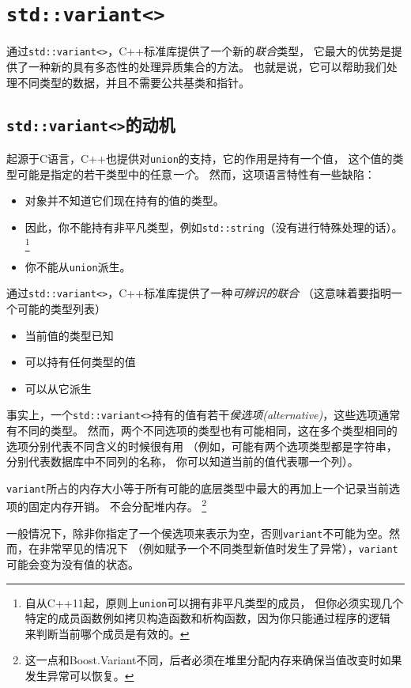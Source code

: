 \section{\texttt{std::variant<>}}\label{ch16}
通过\texttt{std::variant<>}，C++标准库提供了一个新的\emph{联合}类型，
它最大的优势是提供了一种新的具有多态性的处理异质集合的方法。
也就是说，它可以帮助我们处理不同类型的数据，并且不需要公共基类和指针。

\subsection{\texttt{std::variant<>}的动机}
起源于C语言，C++也提供对\texttt{union}的支持，它的作用是持有一个值，
这个值的类型可能是指定的若干类型中的任意\emph{一个}。
然而，这项语言特性有一些缺陷：
\begin{itemize}[leftmargin=*]
    \item 对象并不知道它们现在持有的值的类型。
    \item 因此，你不能持有非平凡类型，例如\texttt{std::string}（没有进行特殊处理的话）。
    \footnote{自从C++11起，原则上\texttt{union}可以拥有非平凡类型的成员，
    但你必须实现几个特定的成员函数例如拷贝构造函数和析构函数，因为你只能通过程序的逻辑
    来判断当前哪个成员是有效的。}
    \item 你不能从\texttt{union}派生。
\end{itemize}
通过\texttt{std::variant<>}，C++标准库提供了一种\emph{可辨识的联合}
（这意味着要指明一个可能的类型列表）
\begin{itemize}[leftmargin=*]
    \item 当前值的类型已知
    \item 可以持有任何类型的值
    \item 可以从它派生
\end{itemize}
事实上，一个\texttt{std::variant<>}持有的值有若干\emph{侯选项(alternative)}，这些选项通常有不同的类型。
然而，两个不同选项的类型也有可能相同，这在多个类型相同的选项分别代表不同含义的时候很有用
（例如，可能有两个选项类型都是字符串，分别代表数据库中不同列的名称，
你可以知道当前的值代表哪一个列）。

\texttt{variant}所占的内存大小等于所有可能的底层类型中最大的再加上一个记录当前选项的固定内存开销。
不会分配堆内存。
\footnote{这一点和Boost.Variant不同，后者必须在堆里分配内存来确保当值改变时如果发生异常可以恢复。}

一般情况下，除非你指定了一个侯选项来表示为空，否则\texttt{variant}不可能为空。然而，在非常罕见的情况下
（例如赋予一个不同类型新值时发生了异常），\texttt{variant}可能会变为没有值的状态。

